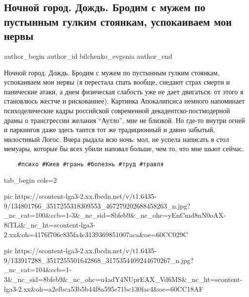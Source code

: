  
 
 
 
 
 
\subsection{Ночной город. Дождь. Бродим с мужем по пустынным гулким стоянкам, успокаиваем мои нервы}
\label{sec:30_12_2020.fb.bilchenko_evgenia.2.gorod_noch_nervy}
\ifcmt
 author_begin
   author_id bilchenko_evgenia
 author_end
\fi

Ночной город. Дождь. Бродим с мужем по пустынным гулким стоянкам, успокаиваем
мои нервы (я перестала спать вообще, снедают страх смерти и панические атаки, а
днем физическая слабость уже не дает двигаться: от этого я становлюсь жестче и
рискованнее). Картинка Апокалипсиса немного напоминает психоделические кадры
российской современной декадентско-постмодерной драмы о трансгрессии желания
\enquote{Аутло}, мне не близкой. Но где-то внутри огней и паркингов даже здесь таится
тот же традиционный и давно забытый, милостивый Логос. Вчера рыдала всю ночь:
мол, не успела написать в стол мемуары, которые бы всех убили наповал больше,
чем то, что мне шьют сейчас.

\begin{verbatim}
	#психо #Киев #грань #болезнь #труд #травля
\end{verbatim}


\ifcmt
  tab_begin cols=2

     pic https://scontent-lga3-2.xx.fbcdn.net/v/t1.6435-9/134801766_3517255318309553_467279202688458263_n.jpg?_nc_cat=100&ccb=1-3&_nc_sid=8bfeb9&_nc_ohc=yEnCmd8nN0oAX-8iTLi&_nc_ht=scontent-lga3-2.xx&oh=4176f706c835fa4c3139369851007aca&oe=60CC029C

     pic https://scontent-lga3-2.xx.fbcdn.net/v/t1.6435-9/133917288_3517255501642868_3175354409244670267_n.jpg?_nc_cat=104&ccb=1-3&_nc_sid=8bfeb9&_nc_ohc=u4adY4NUprEAX_Vd6MS&_nc_ht=scontent-lga3-2.xx&oh=a2efbca53b5b44f8a595c71bc130fac4&oe=60CC18AF

